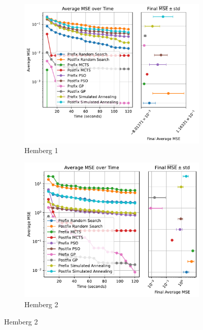 \documentclass[runningheads]{llncs}
\begin{document}
\begin{figure}
    \centering
    
    \begin{subfigure}{0.4\textwidth}
        \includegraphics[width=\linewidth, keepaspectratio]{Hemberg_Benchmarks/Hemberg_Benchmark_1.pdf}
        \caption{Hemberg 1}
        \label{subfig:hemberg_1}
    \end{subfigure}
    \begin{subfigure}[b]{0.4\textwidth}
        \includegraphics[width=\linewidth, keepaspectratio]{Hemberg_Benchmarks/Hemberg_Benchmark_2.pdf}
        \caption{Hemberg 2}
        \label{subfig:hemberg_2}
    \end{subfigure}
    \vspace{0.4cm}
    

\end{figure}
\end{document}

